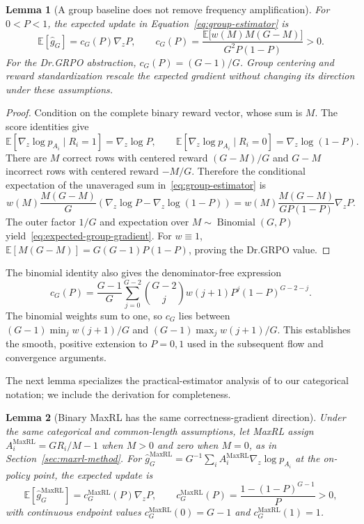 \documentclass{article}
\newcommand{\1}{\mathbf 1}
\newcommand{\E}{\mathbb E}
\newtheorem{lemma}{Lemma}[section]
\theoremstyle{remark}
\theoremstyle{definition}
\theoremstyle{plain}
\begin{document}
\begin{lemma}[A group baseline does not remove frequency amplification]
\label{lem:grpo-mean}
For $0<P<1$, the expected update in Equation~\eqref{eq:group-estimator} is
\begin{equation}
  \E[\widehat g_G]
  =c_G(P)\nabla_z P,
  \qquad
  c_G(P)=
  \frac{\E\!\big[w(M)M(G-M)\big]}{G^2P(1-P)}>0.
  \label{eq:expected-group-gradient}
\end{equation}
For the Dr.GRPO abstraction, $c_G(P)=(G-1)/G$. Group centering and reward
standardization rescale the expected gradient without changing its direction
under these assumptions.
\end{lemma}

\begin{proof}
Condition on the complete binary reward vector, whose sum is $M$. The score
identities give
\[
  \E[\nabla_z\log p_{A_i}\mid R_i=1]=\nabla_z\log P,
  \qquad
  \E[\nabla_z\log p_{A_i}\mid R_i=0]
  =\nabla_z\log(1-P).
\]
There are $M$ correct rows with centered reward $(G-M)/G$ and $G-M$
incorrect rows with centered reward $-M/G$. Therefore the conditional
expectation of the unaveraged sum in~\eqref{eq:group-estimator} is
\[
  w(M)\frac{M(G-M)}{G}
  \left(\nabla_z\log P-\nabla_z\log(1-P)\right)
  =w(M)\frac{M(G-M)}{GP(1-P)}\nabla_zP.
\]
The outer factor $1/G$ and expectation over
$M\sim\operatorname{Binomial}(G,P)$ yield~\eqref{eq:expected-group-gradient}.
For $w\equiv1$,
$\E[M(G-M)]=G(G-1)P(1-P)$, proving the Dr.GRPO value.
\end{proof}

The binomial identity also gives the denominator-free expression
\[
 c_G(P)=\frac{G-1}{G}\sum_{j=0}^{G-2}\binom{G-2}{j}
 w(j+1)P^j(1-P)^{G-2-j}.
\]
The binomial weights sum to one, so $c_G$ lies between
$(G-1)\min_j w(j+1)/G$ and $(G-1)\max_j w(j+1)/G$.
This establishes the smooth, positive extension to $P=0,1$ used in the
subsequent flow and convergence arguments.

The next lemma specializes the practical-estimator analysis of
\citet[Section~4.3 and Appendix~D, Theorem~5]{tajwar2026maxrl}
to our categorical notation; we include the derivation for completeness.

\begin{lemma}[Binary MaxRL has the same correctness-gradient direction]
\label{lem:maxrl-mean}
Under the same categorical and common-length assumptions, let MaxRL assign
$A_i^{\mathrm{MaxRL}}=GR_i/M-1$ when $M>0$ and zero when $M=0$, as in
Section~\ref{sec:maxrl-method}. For
$\widehat g_G^{\mathrm{MaxRL}}=G^{-1}\sum_i
 A_i^{\mathrm{MaxRL}}\nabla_z\log p_{A_i}$ at the on-policy point, the
expected update is
\begin{equation}
  \E[\widehat g_G^{\mathrm{MaxRL}}]
  =c_G^{\mathrm{MaxRL}}(P)\nabla_zP,
  \qquad
  c_G^{\mathrm{MaxRL}}(P)
  =\frac{1-(1-P)^{G-1}}{P}>0,
  \label{eq:maxrl-expected-gradient}
\end{equation}
with continuous endpoint values
$c_G^{\mathrm{MaxRL}}(0)=G-1$ and
$c_G^{\mathrm{MaxRL}}(1)=1$.
\end{lemma}
\end{document}
